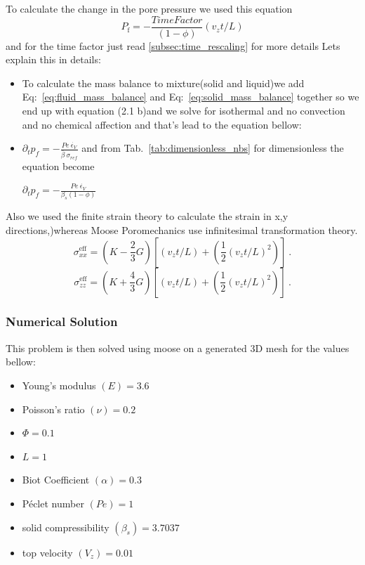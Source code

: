 \documentclass[]{scrreprt}
\newcommand{\pd}{\ensuremath{\partial}}
\newcommand{\pdiff}[2]{\ensuremath{\pd_{#2} #1}}
\begin{document}
To calculate the change in the pore pressure we used this equation 
\begin{equation}
P_{\mathrm{f}} = -\frac{Time Factor}{(1-\phi)}\left( v_{z}t/L\right)
\end{equation}
and for the time factor just read \ref{subsec:time_rescaling} for more details 
\ifshowallderivations
Lets explain this in details: 
\begin{itemize}
\item To calculate the mass balance to mixture(solid and liquid)we  add Eq:~\ref{eq:fluid_mass_balance} and Eq:~\ref{eq:solid_mass_balance} together so we end up with equation (2.1 b)and we solve for isothermal and no convection and no chemical affection and that's lead to the equation bellow:
\item 

$ \pdiff{p_f}{t}=- \frac{Pe\:\dot{\epsilon_V}}{ \bar{\beta}\:\sigma_{ref}}$  
and from Tab.~\ref{tab:dimensionless_nbs} for dimensionless the equation become 

$ \pdiff{p_f}{t}=- \frac{Pe\:\dot{\epsilon_V}}{ \beta_s(1-\phi)}$

 
\end{itemize} 
\fi
Also we used the finite strain theory \citep[][p.6-7]{Coussy2004}
to calculate the strain in x,y directions,)whereas Moose Poromechanics use infinitesimal transformation theory.
\begin{equation}
\sigma_{xx}^{\mathrm{eff}} = (K - \mbox{$\frac{2}{3}$}G)\left[\left( v_{z}t/L\right)+\left(\frac{1}{2}\left( v_{z}t/L\right)^2\right) \right] \ . 
\end{equation}
\begin{equation}
\sigma_{zz}^{\mathrm{eff}} = (K + \mbox{$\frac{4}{3}$}G)\left[\left( v_{z}t/L\right)+\left(\frac{1}{2}\left( v_{z}t/L\right)^2\right) \right] \ .
\end{equation}

\subsubsection{Numerical Solution} 

This problem is then solved using moose on a generated 3D mesh for the values bellow:
\begin{itemize}
\item Young's modulus $(E)=3.6$\
\item Poisson's ratio $(\nu) =0.2$\
\item $\Phi=0.1$\
\item $L=1$\
\item Biot Coefficient $(\alpha)=0.3$\
\item P\'{e}clet number $(Pe)=1$\
\item solid compressibility $(\beta_s)=3.7037$\
\item top velocity $(V_z) =0.01$\
\end{itemize}
\end{document}
